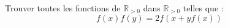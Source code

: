 \begin{exo}
Trouver toutes les fonctions de $\mathbb{R}_{>0}$ dans $\mathbb{R}_{>0}$ telles que :
$$f(x)f(y)=2f(x+yf(x))$$
\end{exo}



